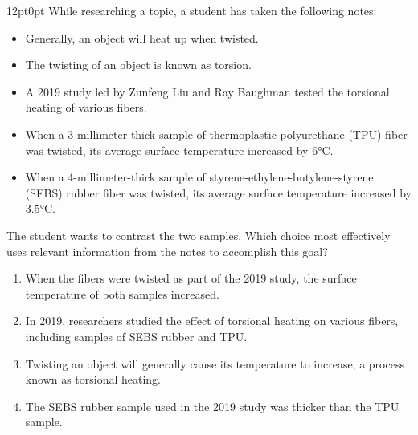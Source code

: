\documentclass[11pt, twocolumn]{article}
\newcounter{questionnum}
\begin{document}
\vspace{6pt}\noindent
\begin{minipage}{\columnwidth}\raggedright
\noindent{}\par\vspace{8pt}
\begin{adjustwidth}{12pt}{0pt}
While researching a topic, a student has taken the following notes:

\begin{itemize}

\item Generally, an object will heat up when twisted.

\item The twisting of an object is known as torsion.

\item A 2019 study led by Zunfeng Liu and Ray Baughman tested the torsional heating of various fibers.

\item When a 3-millimeter-thick sample of thermoplastic polyurethane (TPU) fiber was twisted, its average surface temperature increased by 6°C.

\item When a 4-millimeter-thick sample of styrene-ethylene-butylene-styrene (SEBS) rubber fiber was twisted, its average surface temperature increased by 3.5°C.

\end{itemize}
\vspace{6pt}

The student wants to contrast the two samples. Which choice most effectively uses relevant information from the notes to accomplish this goal?
\begin{enumerate}[label=\Alph*),leftmargin=18pt,topsep=3pt,itemsep=2pt]
  \item When the fibers were twisted as part of the 2019 study, the surface temperature of both samples increased.
  \item In 2019, researchers studied the effect of torsional heating on various fibers, including samples of SEBS rubber and TPU.
  \item Twisting an object will generally cause its temperature to increase, a process known as torsional heating.
  \item The SEBS rubber sample used in the 2019 study was thicker than the TPU sample.
\end{enumerate}
\end{adjustwidth}
\end{minipage}\par
\end{document}
